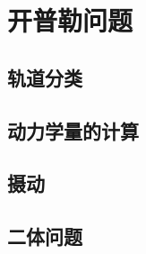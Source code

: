 

\section{开普勒问题}\label{6-3}

\subsection{轨道分类}\label{6-3-1}

\subsection{动力学量的计算}\label{6-3-2}

\subsection{摄动}\label{6-3-3}

\subsection{二体问题}\label{6-3-4}